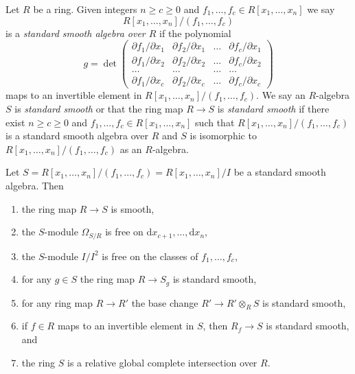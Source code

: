 \begin{definition}
\label{definition-standard-smooth}
Let $R$ be a ring. Given integers $n \geq c \geq 0$ and
$f_1, \ldots, f_c \in R[x_1, \ldots, x_n]$ we say
$$
R[x_1, \ldots, x_n]/(f_1, \ldots, f_c)
$$
is a {\it standard smooth algebra over $R$} if the polynomial
$$
g =
\det
\left(
\begin{matrix}
\partial f_1/\partial x_1 &
\partial f_2/\partial x_1 &
\ldots &
\partial f_c/\partial x_1 \\
\partial f_1/\partial x_2 &
\partial f_2/\partial x_2 &
\ldots &
\partial f_c/\partial x_2 \\
\ldots & \ldots & \ldots & \ldots \\
\partial f_1/\partial x_c &
\partial f_2/\partial x_c &
\ldots &
\partial f_c/\partial x_c
\end{matrix}
\right)
$$
maps to an invertible element in $R[x_1, \ldots, x_n]/(f_1, \ldots, f_c)$.
We say an $R$-algebra $S$ is {\it standard smooth} or that
the ring map $R \to S$ is {\it standard smooth} if there exist
$n \geq c \geq 0$ and $f_1, \ldots, f_c \in R[x_1, \ldots, x_n]$
such that $R[x_1, \ldots, x_n]/(f_1, \ldots, f_c)$ is a standard smooth
algebra over $R$ and $S$ is isomorphic to
$R[x_1, \ldots, x_n]/(f_1, \ldots, f_c)$ as an $R$-algebra.
\end{definition}

\begin{lemma}
\label{lemma-standard-smooth}
Let
$S = R[x_1, \ldots, x_n]/(f_1, \ldots, f_c) = R[x_1, \ldots, x_n]/I$
be a standard smooth algebra. Then
\begin{enumerate}
\item the ring map $R \to S$ is smooth,
\item the $S$-module $\Omega_{S/R}$ is free on
$\text{d}x_{c + 1}, \ldots, \text{d}x_n$,
\item the $S$-module $I/I^2$ is free on the classes of $f_1, \ldots, f_c$,
\item for any $g \in S$ the ring map $R \to S_g$ is standard smooth,
\item for any ring map $R \to R'$ the base change
$R' \to R'\otimes_R S$ is standard smooth,
\item if $f \in R$ maps to an invertible element in $S$, then
$R_f \to S$ is standard smooth, and
\item the ring $S$ is a relative global complete intersection over $R$.
\end{enumerate}
\end{lemma}

